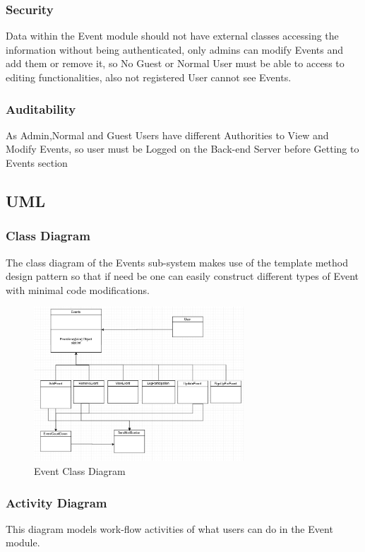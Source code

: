 \subsubsection{Security}
Data within the Event module should not have external classes accessing the information without being authenticated, only admins can modify Events and add them or remove it, so No Guest or Normal User must be able to access to editing functionalities, also not registered User cannot see Events.

\subsubsection{Auditability}
As Admin,Normal and Guest Users have different Authorities to View and Modify Events, so user must be Logged on the Back-end Server before Getting to Events section

 
\subsection{UML}
\subsubsection{Class Diagram}
The class diagram of the Events sub-system makes use of the template method design pattern so that if need be one can easily construct different types of Event with minimal code modifications.

\begin{figure}[H]
	\centering
	\includegraphics[width=0.7\textwidth]{event/ClassDiagrams(NoMethods).PNG}
	\caption{Event Class Diagram}
\end{figure}



\pagebreak
\subsubsection{Activity Diagram}
This diagram models work-flow activities of what users can do in the Event module.

